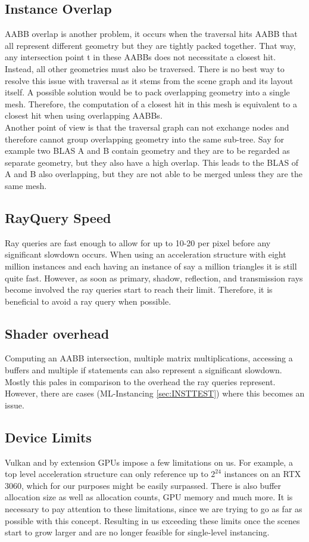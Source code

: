 \subsection{Instance Overlap}
\label{sec:BottleInstanceOverlap}
AABB overlap is another problem, it occurs when the traversal hits AABB that all represent different geometry but they are tightly packed together. That way, any intersection point t in these AABBs does not necessitate a closest hit. Instead, all other geometries must also be traversed. There is no best way to resolve this issue with traversal as it stems from the scene graph and its layout itself. A possible solution would be to pack overlapping geometry into a single mesh. Therefore, the computation of a closest hit in this mesh is equivalent to a closest hit when using overlapping AABBs.\\
Another point of view is that the traversal graph can not exchange nodes and therefore cannot group overlapping geometry into the same sub-tree. Say for example two BLAS A and B contain geometry and they are to be regarded as separate geometry, but they also have a high overlap. This leads to the BLAS of A and B also overlapping, but they are not able to be merged unless they are the same mesh.
\subsection{RayQuery Speed}
\label{sec:BottleQuerySpeed}
Ray queries are fast enough to allow for up to 10-20 per pixel before any significant slowdown occurs. When using an acceleration structure with eight million instances and each having an instance of say a million triangles it is still quite fast. However, as soon as primary, shadow, reflection, and transmission rays become involved the ray queries start to reach their limit. Therefore, it is beneficial to avoid a ray query when possible.
\subsection{Shader overhead}
\label{sec:BottleShaderOverhead}
Computing an AABB intersection, multiple matrix multiplications, accessing a buffers and multiple if statements can also represent a significant slowdown. Mostly this pales in comparison to the overhead the ray queries represent. However, there are cases (ML-Instancing \ref{sec:INSTTEST}) where this becomes an issue.
\subsection{Device Limits}
\label{sec:BottleDeviceLimits}
Vulkan and by extension GPUs impose a few limitations on us. For example, a top level acceleration structure can only reference up to $2^{24}$ instances on an RTX 3060, which for our purposes might be easily surpassed. There is also buffer allocation size as well as allocation counts, GPU memory and much more. It is necessary to pay attention to these limitations, since we are trying to go as far as possible with this concept. Resulting in us exceeding these limits once the scenes start to grow larger and are no longer feasible for single-level instancing.
\newpage
